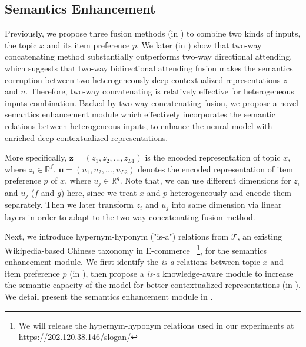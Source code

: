 



\subsection{Semantics Enhancement}
\label{sec:semantics}
Previously, we propose three fusion methods (in )
to combine two kinds of inputs, the topic $x$ and its item preference $p$.
We later (in ) show that two-way concatenating method
substantially outperforms two-way directional attending, 
which suggests that two-way bidirectional attending fusion 
makes the semantics corruption between two heterogeneously deep contextualized representations $z$ and $u$.
Therefore, two-way concatenating is relatively effective for 
heterogeneous inputs combination.
Backed by two-way concatenating fusion, 
we propose a novel semantics enhancement module 
which effectively incorporates the semantic relations
between heterogeneous inputs,
to enhance the neural model
with enriched deep contextualized representations.

More specifically, 
$\textbf{z}=(z_1, z_2, ..., z_{L1})$ is the encoded representation of topic $x$,
where $z_i \in \mathbb{R}^{f}$.
$\textbf{u}=(u_1, u_2, ..., u_{L2})$ denotes the encoded representation of item preference $p$ of $x$, where $u_j \in \mathbb{ R }^{g}$.
Note that, we can use different dimensions for $z_i$ and $u_j$ ($f$ and $g$) here, 
since we treat $x$ and $p$ heterogeneously and encode them separately.
Then we later transform $z_i$ and $u_j$ into same dimension via linear layers
in order to adapt to the two-way concatenating fusion method.

Next, we introduce hypernym-hyponym ("is-a") relations from $\mathcal{T}$, an existing Wikipedia-based Chinese taxonomy in E-commerce
~\footnote{We will release the hypernym-hyponym relations used in our experiments at https://202.120.38.146/slogan/},
for the semantics enhancement module.
We first identify the \emph{is-a} relations between topic $x$ and item preference $p$ 
(in ),
then propose a \emph{is-a} knowledge-aware module to increase the semantic capacity of the model for better contextualized representations
(in ).
We detail present the semantics enhancement module
in .


